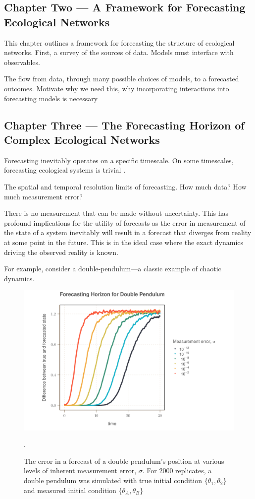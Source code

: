 \documentclass[]{article}
\begin{document}
\clearpage
\subsection{Chapter Two --- A Framework for Forecasting Ecological Networks}

This chapter outlines a framework for forecasting the structure of ecological networks. First, a survey of the sources of data. Models must interface with observables. 

The flow from data, through many possible choices of models, to a forecasted outcomes. 
Motivate why we need this, why incorporating interactions into forecasting models is necessary 

\subsection{Chapter Three --- The Forecasting Horizon of Complex Ecological Networks}

Forecasting inevitably operates on a specific timescale. On some timescales, forecasting ecological systems is trivial \cite{crutchfeld}.


The spatial and temporal resolution limits of forecasting. 
How much data? How much measurement error?

There is no measurement that can be made without uncertainty. This has profound implications for the utility of forecasts as the error in measurement of the state of a system inevitably will result in a forecast that diverges from reality at some point in the future. This is in the ideal case where the exact dynamics driving the observed reality is known.

For example, consider a double-pendulum---a classic example of chaotic dynamics. 



\begin{figure}[h]
    \centering
    \includegraphics[width=17cm]{figs/forecasting_horizon.png}
    \caption{The error in a forecast of a double pendulum's position at various levels of inherent measurement error, $\sigma$. For 2000 replicates, a double pendulum was simulated with true initial condition $\{ \theta_1, \theta_2 \}$ and measured initial condition $\{\theta_A, \theta_B \}$}.
    \label{fig:forecasting_horizon}
\end{figure}
\end{document}
